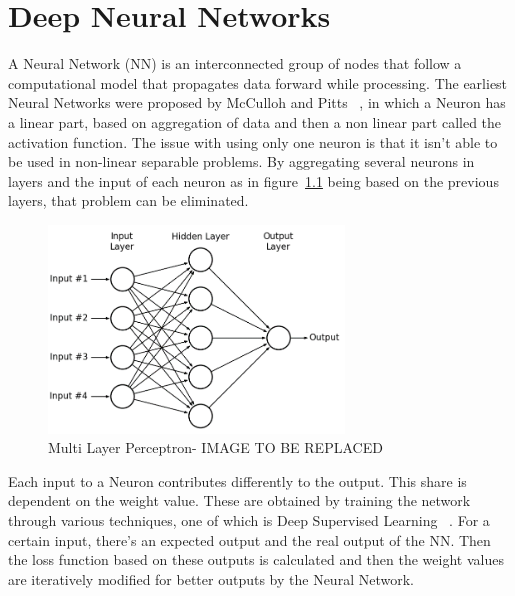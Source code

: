 \chapter{Deep Neural Networks}
\label{chapter:cnn}



\quad A Neural Network (NN) is an interconnected group of nodes that follow a computational model that propagates data forward while processing. 
The earliest Neural Networks were proposed by McCulloh and Pitts~\cite{neuron:model}
, in which a Neuron has a linear part, based on aggregation of data and then a non linear part called the activation function. The issue with using only one neuron
is that it isn't able to be used in non-linear separable problems.
By aggregating several neurons in layers and the input of each neuron as in figure~\ref{MLP}
being based on the previous layers, that problem can be eliminated.

\begin{figure}[!htbp]
    \centering
    \includegraphics[width=0.7\textwidth]{Figures/mlp-tobereplaced.png}
    \caption{Multi Layer Perceptron- IMAGE TO BE REPLACED}
    \label{MLP}
\end{figure} 


 Each input to a Neuron contributes differently to the output. This share is dependent on the weight value. 
 These are obtained by training the network through various techniques, one of which is Deep Supervised
 Learning~\cite{deeplearning}
 . For a certain input, there's an expected output and the real output of the NN. Then the loss function based on these outputs
 is calculated and then the weight values are iteratively modified for better outputs by the Neural Network.



